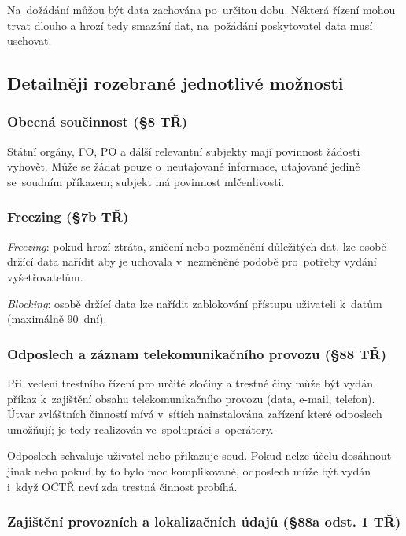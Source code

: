Na~dožádání můžou být data zachována po~určitou dobu.
Některá řízení mohou trvat dlouho a hrozí tedy smazání dat, na~požádání poskytovatel data musí uschovat.


\subsection{Detailněji rozebrané jednotlivé možnosti}

\subsubsection{Obecná součinnost (§8 TŘ)}

Státní orgány, FO, PO a dálší relevantní subjekty mají povinnost žádosti vyhovět.
Může se žádat pouze o~neutajované informace, utajované jedině se~soudním příkazem; subjekt má povinnost mlčenlivosti.


\subsubsection{Freezing (§7b TŘ)}

\emph{Freezing}: pokud hrozí ztráta, zničení nebo pozměnění důležitých dat, lze osobě držící data nařídit aby je uchovala v~nezměněné podobě pro~potřeby vydání vyšetřovatelům.

\emph{Blocking}: osobě držící data lze nařídit zablokování přístupu uživateli k~datům (maximálně 90~dní).

\subsubsection{Odposlech a záznam telekomunikačního provozu (§88 TŘ)}

Při~vedení trestního řízení pro určité zločiny a trestné činy může být vydán příkaz k~zajištění obsahu telekomunikačního provozu (data, e-mail, telefon).
Útvar zvláštních činností mívá v~sítích nainstalována zařízení které odposlech umožňují; je tedy realizován ve~spolupráci s~operátory.

Odposlech schvaluje uživatel nebo přikazuje soud.
Pokud nelze účelu dosáhnout jinak nebo pokud by to bylo moc komplikované, odposlech může být vydán i~když OČTŘ neví zda trestná činnost probíhá.


\subsubsection{Zajištění provozních a lokalizačních údajů (§88a odst. 1 TŘ)}

